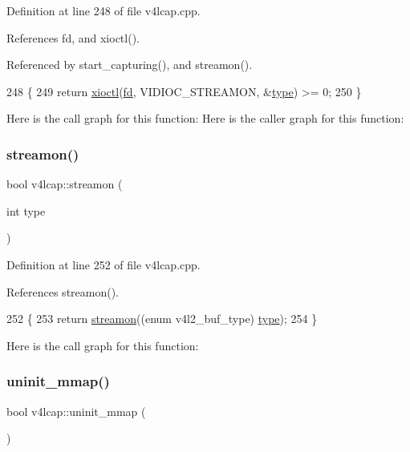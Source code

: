 Definition at line 248 of file v4lcap.\+cpp.



References fd, and xioctl().



Referenced by start\+\_\+capturing(), and streamon().


\begin{DoxyCode}
248                                              \{
249     \textcolor{keywordflow}{return} \hyperlink{classv4lcap_ab5aaa5a8c0df17f5ca57e0b5170232cb}{xioctl}(\hyperlink{classv4lcap_a38109593bde997dad13b3a461569573d}{fd}, VIDIOC\_STREAMON, &\hyperlink{classstd_1_1conditional_1_1type}{type}) >= 0;
250 \}
\end{DoxyCode}
Here is the call graph for this function\+:
Here is the caller graph for this function\+:
\mbox{\label{classv4lcap_a171600fdcef434fc621e62d9373fcaf8}} 
\subsubsection{\texorpdfstring{streamon()}{streamon()}\hspace{0.1cm}{\footnotesize\ttfamily [2/2]}}
{\footnotesize\ttfamily bool v4lcap\+::streamon (\begin{DoxyParamCaption}\item[{int}]{type }\end{DoxyParamCaption})}



Definition at line 252 of file v4lcap.\+cpp.



References streamon().


\begin{DoxyCode}
252                               \{
253     \textcolor{keywordflow}{return} \hyperlink{classv4lcap_abb1f77b86c0368cd40dab1fb8d4a2565}{streamon}((\textcolor{keyword}{enum} v4l2\_buf\_type) \hyperlink{classstd_1_1conditional_1_1type}{type});
254 \}
\end{DoxyCode}
Here is the call graph for this function\+:
\mbox{\label{classv4lcap_aafab5fd381c1d5858cd87f42560a40ab}} 
\subsubsection{\texorpdfstring{uninit\+\_\+mmap()}{uninit\_mmap()}}
{\footnotesize\ttfamily bool v4lcap\+::uninit\+\_\+mmap (\begin{DoxyParamCaption}{ }\end{DoxyParamCaption})}



